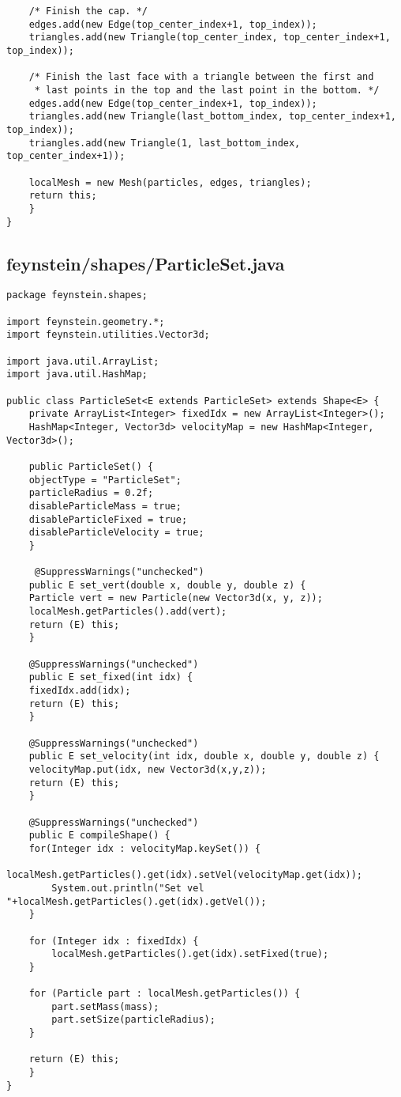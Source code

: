 \begin{lstlisting}
	/* Finish the cap. */
	edges.add(new Edge(top_center_index+1, top_index));
	triangles.add(new Triangle(top_center_index, top_center_index+1, top_index));

	/* Finish the last face with a triangle between the first and
	 * last points in the top and the last point in the bottom. */
	edges.add(new Edge(top_center_index+1, top_index));
	triangles.add(new Triangle(last_bottom_index, top_center_index+1, top_index));
	triangles.add(new Triangle(1, last_bottom_index, top_center_index+1));

	localMesh = new Mesh(particles, edges, triangles);
	return this;
    }
}\end{lstlisting}

\subsection*{feynstein/shapes/ParticleSet.java}
\begin{lstlisting}
package feynstein.shapes;

import feynstein.geometry.*;
import feynstein.utilities.Vector3d;

import java.util.ArrayList;
import java.util.HashMap;

public class ParticleSet<E extends ParticleSet> extends Shape<E> {
    private ArrayList<Integer> fixedIdx = new ArrayList<Integer>();
    HashMap<Integer, Vector3d> velocityMap = new HashMap<Integer, Vector3d>();
	
    public ParticleSet() {
	objectType = "ParticleSet";
	particleRadius = 0.2f;
	disableParticleMass = true;
	disableParticleFixed = true;
	disableParticleVelocity = true;
    }
    
	 @SuppressWarnings("unchecked")
    public E set_vert(double x, double y, double z) {
	Particle vert = new Particle(new Vector3d(x, y, z));
	localMesh.getParticles().add(vert);
	return (E) this;
    }
	
	@SuppressWarnings("unchecked")
    public E set_fixed(int idx) {
	fixedIdx.add(idx);
	return (E) this;
    }
	
	@SuppressWarnings("unchecked")
    public E set_velocity(int idx, double x, double y, double z) {
	velocityMap.put(idx, new Vector3d(x,y,z));
	return (E) this;
    }

    @SuppressWarnings("unchecked")
    public E compileShape() {
	for(Integer idx : velocityMap.keySet()) {
	    localMesh.getParticles().get(idx).setVel(velocityMap.get(idx));
	    System.out.println("Set vel "+localMesh.getParticles().get(idx).getVel());
	}

	for (Integer idx : fixedIdx) {
	    localMesh.getParticles().get(idx).setFixed(true);
	}

	for (Particle part : localMesh.getParticles()) {
	    part.setMass(mass);
	    part.setSize(particleRadius);
	}

	return (E) this;
    }
}\end{lstlisting}

